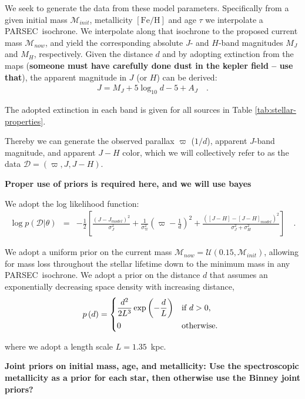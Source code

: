 \documentclass[preprint]{aastex}
\newcommand{\acronym}[1]{{\small{#1}}}
\newcommand{\parsec}{\acronym{PARSEC}}
\newcommand{\feh}{[\mathrm{Fe/H}]}
\newcommand{\parallax}{\varpi}
\newcommand{\mass}{\mathcal{M}}
\newcommand{\given}{|}
\newcommand{\data}{\mathcal{D}}
\newcommand{\uniform}[2]{\mathcal{U}\left(#1,#2\right)}
\begin{document}
We seek to generate the data from these model parameters. Specifically from a given initial mass $\mass_{init}$, metallicity $\feh$ and age $\tau$ we interpolate a \parsec\ isochrone.  We interpolate along that isochrone to the proposed current mass $\mass_{now}$, and yield the corresponding absolute $J$- and $H$-band magnitudes $M_J$ and $M_H$, respectively.  Given the distance $d$ and by adopting extinction from the \citet{Schlegel} maps (\textbf{someone must have carefully done dust in the kepler field -- use that}), the apparent magnitude in $J$ (or $H$) can be derived: 
\begin{eqnarray}
    J = M_J + 5\log_{10}d - 5 + A_J \quad .
\end{eqnarray}

The adopted extinction in each band is given for all sources in Table \ref{tab:stellar-properties}.


Thereby we can generate the observed parallax $\parallax$ ($1/d$), apparent $J$-band magnitude, and apparent $J - H$ color, which we will collectively refer to as the data $\data = (\parallax, J, J-H)$. 

\textbf{Proper use of priors is required here, and we will use bayes}


We adopt the log likelihood function:
\begin{eqnarray}\label{eq:likelihood-function}
    \log{p\left(\data\given\theta\right)} & = & -\frac{1}{2}\left[\frac{(J-J_{model})^2}{\sigma_{J}^2} + \frac{1}{\sigma_\parallax^2}\left(\parallax - \frac{1}{d}\right)^2 + \frac{\left([J-H] - [J-H]_{model}\right)^2}{\sigma_J^2 + \sigma_H^2}\right] \quad . 
\end{eqnarray}


We adopt a uniform prior on the current mass $\mass_{now} = \uniform{0.15}{\mass_{init}}$, allowing for mass loss throughout the stellar lifetime down to the minimum mass in any \parsec\ isochrone.  We adopt a prior on the distance $d$ that assumes an exponentially decreasing space density with increasing distance,
\begin{eqnarray}
    p\left(d\right) = \begin{dcases*}
        \frac{d^2}{2L^3}\exp{\left(-\frac{d}{L}\right)} & if $d > 0$,\\
        0 & otherwise.
    \end{dcases*}
\end{eqnarray}

\noindent{}where we adopt a length scale $L = 1.35$~kpc.

\textbf{Joint priors on initial mass, age, and metallicity: Use the spectroscopic metallicity as a prior for each star, then otherwise use the Binney joint priors?}
\end{document}
